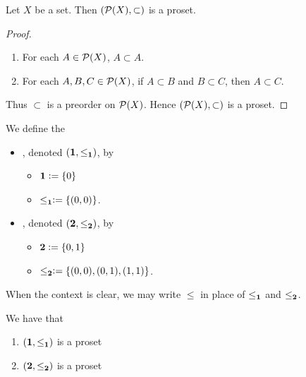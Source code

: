 \documentclass{book}
\begin{document}
	\begin{ex} 
		Let $X$ be a set. Then $(\mathcal{P}(X), \subset)$ is a proset.
	\end{ex}
	
	\begin{proof}\
		\begin{enumerate}
			\item For each $A \in \mathcal{P}(X)$, $A \subset A$. 
			\item For each $A,B,C \in \mathcal{P}(X)$, if $A \subset B$ and $B \subset C$, then $A \subset C$. 
		\end{enumerate}
		Thus $\subset$ is a preorder on $\mathcal{P}(X)$. Hence $(\mathcal{P}(X), \subset)$ is a proset.
	\end{proof}
	
	\begin{defn} 
		We define the 
		\begin{itemize}
			\item {}, denoted $(\mathbf{1}, \leq_{\mathbf{1}})$, by 
			\begin{itemize}
				\item $\mathbf{1} \vcentcolon= \{0\}$ 
				\item $\leq_{\mathbf{1}} \vcentcolon= \{(0, 0)\}$.  
			\end{itemize}
			\item {}, denoted $(\mathbf{2}, \leq_{\mathbf{2}})$, by 
			\begin{itemize}
				\item $\mathbf{2} \vcentcolon= \{0, 1\}$ 
				\item $\leq_{\mathbf{2}} \vcentcolon= \{(0, 0), (0, 1), (1, 1) \}$.  
			\end{itemize}
		\end{itemize}
	\end{defn}
	
	\begin{note}
		When the context is clear, we may write $\leq$ in place of $\leq_{\mathbf{1}}$ and $\leq_{\mathbf{2}}$.
	\end{note}
	
	\begin{ex} 
		We have that 
		\begin{enumerate}
			\item $(\mathbf{1}, \leq_{\mathbf{1}})$ is a proset
			\item $(\mathbf{2}, \leq_{\mathbf{2}})$ is a proset
		\end{enumerate}
	\end{ex}
	
\end{document}
